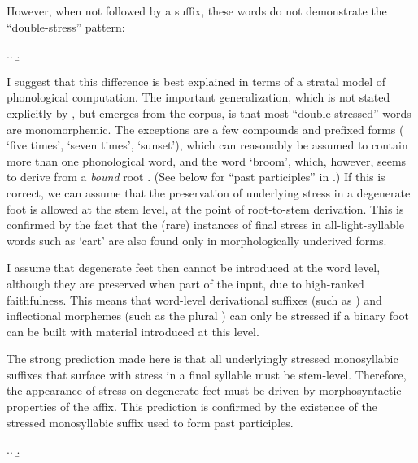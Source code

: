 However, when not followed by a suffix, these words do not demonstrate the \enquote{double-stress} pattern:

\ex.\a.
\b.

I suggest that this difference is best explained in terms of a stratal model of phonological computation. The important generalization, which is not stated explicitly by \citet{humphreys95:_phonol_bothoa_saint_nicol_pelem}, but emerges from the corpus, is that most \enquote{double-stressed} words are monomorphemic. The exceptions are a few compounds and prefixed forms (\ipa{[ˈpæmˌʧəs]} `five times', \ipa{[ˈseisˌʧəs]} `seven times', \ipa{[ˈdiˌʃɒːl]} `sunset'), which can reasonably be assumed to contain more than one phonological word, and the word \ipa{[ˌʃyːˈbɛl]} `broom', which, however, seems to derive from a \emph{bound} root . (See below for \enquote{past participles} in \ipa{[ɛĭd]}.) If this is correct, we can assume that the preservation of underlying stress in a degenerate foot is allowed at the stem level, \ie at the point of root\hyp to\hyp stem derivation. This is confirmed by the fact that the (rare) instances of final stress in all\hyp light\hyp syllable words such as \ipa{[kariˈʧɛl]} `cart' are also found only in morphologically underived forms.

I assume that degenerate feet then cannot be introduced at the word level, although they are preserved when part of the input, due to high-ranked faithfulness. This means that word-level derivational suffixes (such as ) and inflectional morphemes (such as the plural ) can only be stressed if a binary foot can be built with material introduced at this level.

The strong prediction made here is that all underlyingly stressed monosyllabic suffixes that surface with stress in a final syllable must be stem-level. Therefore, the appearance of stress on degenerate feet must be driven by morphosyntactic properties of the affix. This prediction is confirmed by the existence of the stressed monosyllabic suffix  used to form past participles.

\ex.\a.
\b.

